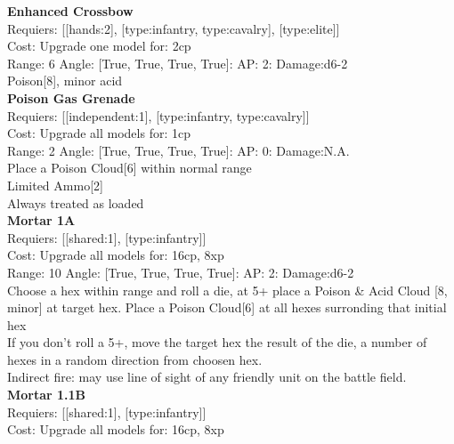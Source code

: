 {\bf Enhanced Crossbow } \\

Requiers: [[hands:2], [type:infantry, type:cavalry], [type:elite]] \\
Cost: Upgrade one model for: 2cp \\


Range: 6  Angle: [True, True, True, True]: AP: 2: Damage:d6-2 \\
Poison[8], minor acid\\ 






{\bf Poison Gas Grenade } \\

Requiers: [[independent:1], [type:infantry, type:cavalry]] \\
Cost: Upgrade all models for: 1cp \\


Range: 2  Angle: [True, True, True, True]: AP: 0: Damage:N.A. \\
Place a Poison Cloud[6] within normal range\\ 
Limited Ammo[2]\\ 
Always treated as loaded\\ 






{\bf Mortar 1A } \\

Requiers: [[shared:1], [type:infantry]] \\
Cost: Upgrade all models for: 16cp, 8xp \\


Range: 10  Angle: [True, True, True, True]: AP: 2: Damage:d6-2 \\
Choose a hex within range and roll a die, at 5+ place a Poison \& Acid Cloud [8, minor] at target hex. Place a Poison Cloud[6]  at all hexes surronding that initial hex\\ 
If you don't roll a 5+, move the target hex the result of the die, a number of hexes in a random direction from choosen hex.\\ 
Indirect fire: may use line of sight of any friendly unit on the battle field.\\ 






{\bf Mortar 1.1B } \\

Requiers: [[shared:1], [type:infantry]] \\
Cost: Upgrade all models for: 16cp, 8xp \\


